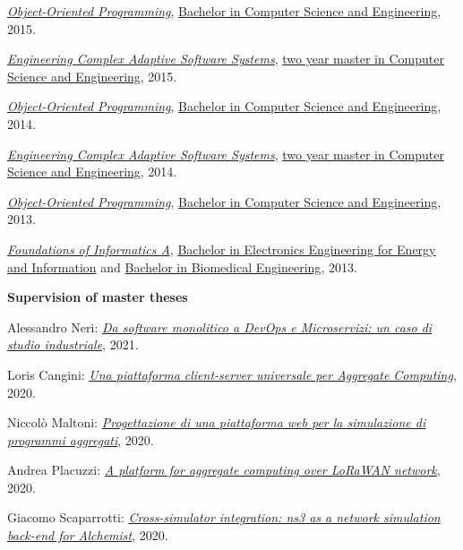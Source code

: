 \begin{outerlist}
\begin{innerlist}
      \item \href{http://archive.fo/puTDG}{\textit{Object-Oriented Programming}}, \href{http://archive.fo/UM5wl}{Bachelor in Computer Science and Engineering}, 2015.
      \item \href{http://archive.fo/5LhhW}{\textit{Engineering Complex Adaptive Software Systems}}, \href{http://archive.fo/toz5c}{two year master in Computer Science and Engineering}, 2015.
      \item \href{http://archive.fo/8jzEp}{\textit{Object-Oriented Programming}}, \href{http://archive.fo/UM5wl}{Bachelor in Computer Science and Engineering}, 2014.
      \item \href{http://archive.fo/h8JCD}{\textit{Engineering Complex Adaptive Software Systems}}, \href{http://archive.fo/toz5c}{two year master in Computer Science and Engineering}, 2014.
      \item \href{http://archive.fo/0Gr16}{\textit{Object-Oriented Programming}}, \href{http://archive.fo/UM5wl}{Bachelor in Computer Science and Engineering}, 2013.
      \item \href{http://archive.fo/XZFR0}{\textit{Foundations of Informatics A}}, \href{http://archive.fo/30rN0}{Bachelor in Electronics Engineering for Energy and Information} and \href{http://archive.fo/jW52L}{Bachelor in Biomedical Engineering}, 2013.
    \end{innerlist}
\item[] \textbf{Supervision of master theses} %
    \begin{innerlist}
      \item Alessandro Neri: \href{http://amslaurea.unibo.it/23043/}{\textit{Da software monolitico a DevOps e Microservizi: un caso di studio industriale}}, 2021.
      \item Loris Cangini: \href{http://amslaurea.unibo.it/20410/}{\textit{Una piattaforma client-server universale per Aggregate Computing}}, 2020.
      \item Niccolò Maltoni: \href{http://amslaurea.unibo.it/20478/}{\textit{Progettazione di una piattaforma web per la simulazione di programmi aggregati}}, 2020.
      \item Andrea Placuzzi: \href{http://amslaurea.unibo.it/20484/}{\textit{A platform for aggregate computing over LoRaWAN network}}, 2020.
      \item Giacomo Scaparrotti: \href{http://amslaurea.unibo.it/20440/}{\textit{Cross-simulator integration: ns3 as a network simulation back-end for Alchemist}}, 2020.

\end{innerlist}
\end{outerlist}
